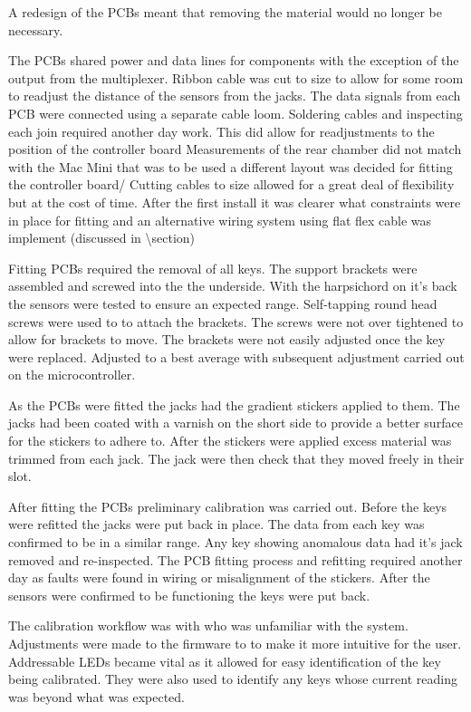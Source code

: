 A redesign of the PCBs meant that removing the material would no longer
be necessary.

The PCBs shared power and data lines for components with the exception
of the output from the multiplexer. Ribbon cable was cut to size to
allow for some room to readjust the distance of the sensors from the
jacks. The data signals from each PCB were connected using a separate
cable loom. Soldering cables and inspecting each join required another
day work. This did allow for readjustments to the position of the
controller board Measurements of the rear chamber did not match with the
Mac Mini that was to be used a different layout was decided for fitting
the controller board/ Cutting cables to size allowed for a great deal of
flexibility but at the cost of time. After the first install it was
clearer what constraints were in place for fitting and an alternative
wiring system using flat flex cable was implement (discussed in
\textbackslash section)

Fitting PCBs required the removal of all keys. The support brackets were
assembled and screwed into the the underside. With the harpsichord on
it's back the sensors were tested to ensure an expected range.
Self-tapping round head screws were used to to attach the brackets. The
screws were not over tightened to allow for brackets to move. The
brackets were not easily adjusted once the key were replaced. Adjusted
to a best average with subsequent adjustment carried out on the
microcontroller.

As the PCBs were fitted the jacks had the gradient stickers applied to
them. The jacks had been coated with a varnish on the short side to
provide a better surface for the stickers to adhere to. After the
stickers were applied excess material was trimmed from each jack. The
jack were then check that they moved freely in their slot.

After fitting the PCBs preliminary calibration was carried out. Before
the keys were refitted the jacks were put back in place. The data from
each key was confirmed to be in a similar range. Any key showing
anomalous data had it's jack removed and re-inspected. The PCB fitting
process and refitting required another day as faults were found in
wiring or misalignment of the stickers. After the sensors were
confirmed to be functioning the keys were put back.

The calibration workflow was with  who was unfamiliar with
the system. Adjustments were made to the firmware to to make it more
intuitive for the user. Addressable LEDs became vital as it allowed for
easy identification of the key being calibrated. They were also used to
identify any keys whose current reading was beyond what was expected.

